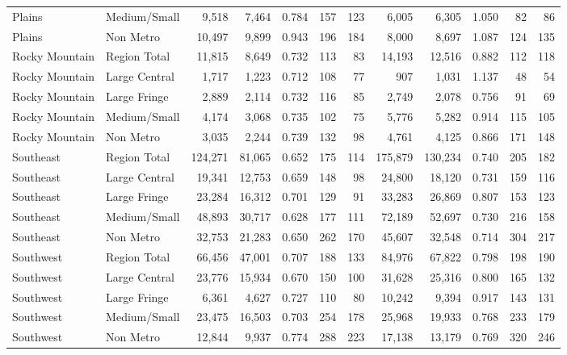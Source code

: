 \documentclass[
]{article}
\begin{document}
\begin{table}
\begin{tabular}[t]{llrrrrrrrrrr}
Plains & Medium/Small & 9,518 & 7,464 & 0.784 & 157 & 123 & 6,005 & 6,305 & 1.050 & 82 & 86\\
Plains & Non Metro & 10,497 & 9,899 & 0.943 & 196 & 184 & 8,000 & 8,697 & 1.087 & 124 & 135\\
\addlinespace[5pt]
Rocky Mountain & Region Total & 11,815 & 8,649 & 0.732 & 113 & 83 & 14,193 & 12,516 & 0.882 & 112 & 118\\
\addlinespace[2pt]
Rocky Mountain & Large Central & 1,717 & 1,223 & 0.712 & 108 & 77 & 907 & 1,031 & 1.137 & 48 & 54\\
Rocky Mountain & Large Fringe & 2,889 & 2,114 & 0.732 & 116 & 85 & 2,749 & 2,078 & 0.756 & 91 & 69\\
Rocky Mountain & Medium/Small & 4,174 & 3,068 & 0.735 & 102 & 75 & 5,776 & 5,282 & 0.914 & 115 & 105\\
Rocky Mountain & Non Metro & 3,035 & 2,244 & 0.739 & 132 & 98 & 4,761 & 4,125 & 0.866 & 171 & 148\\
\addlinespace[5pt]
Southeast & Region Total & 124,271 & 81,065 & 0.652 & 175 & 114 & 175,879 & 130,234 & 0.740 & 205 & 182\\
\addlinespace[2pt]
Southeast & Large Central & 19,341 & 12,753 & 0.659 & 148 & 98 & 24,800 & 18,120 & 0.731 & 159 & 116\\
Southeast & Large Fringe & 23,284 & 16,312 & 0.701 & 129 & 91 & 33,283 & 26,869 & 0.807 & 153 & 123\\
Southeast & Medium/Small & 48,893 & 30,717 & 0.628 & 177 & 111 & 72,189 & 52,697 & 0.730 & 216 & 158\\
Southeast & Non Metro & 32,753 & 21,283 & 0.650 & 262 & 170 & 45,607 & 32,548 & 0.714 & 304 & 217\\
\addlinespace[5pt]
Southwest & Region Total & 66,456 & 47,001 & 0.707 & 188 & 133 & 84,976 & 67,822 & 0.798 & 198 & 190\\
\addlinespace[2pt]
Southwest & Large Central & 23,776 & 15,934 & 0.670 & 150 & 100 & 31,628 & 25,316 & 0.800 & 165 & 132\\
Southwest & Large Fringe & 6,361 & 4,627 & 0.727 & 110 & 80 & 10,242 & 9,394 & 0.917 & 143 & 131\\
Southwest & Medium/Small & 23,475 & 16,503 & 0.703 & 254 & 178 & 25,968 & 19,933 & 0.768 & 233 & 179\\
Southwest & Non Metro & 12,844 & 9,937 & 0.774 & 288 & 223 & 17,138 & 13,179 & 0.769 & 320 & 246\\
\bottomrule
\end{tabular}
\end{table}
\end{document}
